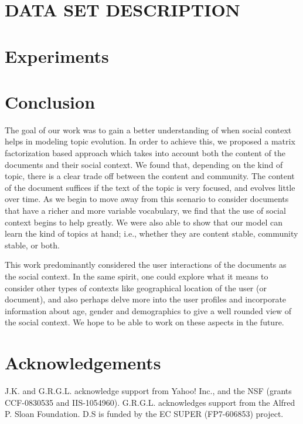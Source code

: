 \section{DATA SET DESCRIPTION}
\label{sec:data_set_description}


\section{Experiments}
\label{sec:experiments}


\vspace{-0.3cm}
\section{Conclusion}
\label{sec:conclusion}
The goal of our work was to gain a better understanding of when social context
helps in modeling topic evolution.  In order to achieve this, we proposed a matrix factorization based
approach which takes into account both the content of the documents and their social
context.  We found that, depending on the kind of topic, there is a clear trade
off between the content and community.
The content of the document
suffices if the text of the topic is very focused, and evolves little over time.
As we begin to move away from this scenario to consider documents that have a richer
and more variable vocabulary, we find that the use of social context
begins to help greatly.  We were also able to show
that our model can learn the kind of topics at hand; i.e., whether they are
content stable, community stable, or
both.

This work predominantly considered the user interactions of the documents
as the social context.  In the same spirit, one could explore what it means to consider
other types of contexts like geographical location of the user (or document),
and also perhaps delve more into the user profiles and incorporate information
about age, gender and demographics to give a well rounded view of the social context.
We hope to be able to work on these aspects in the future.
\section{Acknowledgements}
J.K. and G.R.G.L. acknowledge support from Yahoo! Inc., 
and the NSF (grants CCF-0830535 and IIS-1054960). 
G.R.G.L. acknowledges support from the Alfred P. Sloan Foundation.
D.S is funded by the EC SUPER (FP7-606853) project.
\vspace{-0.2cm}
{\small
}

